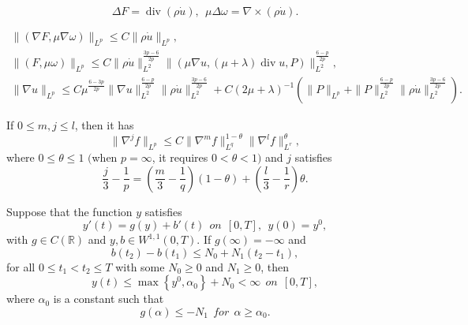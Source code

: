 \documentclass[10pt,a4paper]{amsart}
\DeclareMathOperator{\divv}{div}
\begin{document}
\begin{equation}\label{3.4}
\Delta F = \divv (\rho \dot u),\ \  \mu \Delta \omega = \nabla \times(\rho \dot u).
\end{equation}

\begin{gather}\label{3.5}
\|(\nabla F,\mu \nabla \omega )\|_{L^p} \leq C \|\rho \dot u\|_{L^p},
\\ \label{3.6}
\|(F, \mu \omega )\|_{L^p} \leq C \|\rho \dot u\|_{L^2}^{\frac{3p - 6}{2p}} \|(\mu \nabla u, (\mu + \lambda ) \divv u, P)\|_{L^2}^{\frac{6 - p}{2p}},
\\ \label{3.7}
\|\nabla u\|_{L^p}
\leq C \mu^{\frac{6 - 3p}{2p}} \|\nabla u\|_{L^2}^{\frac{6 - p}{2p}} \|\rho \dot{u}\|_{L^2}^{\frac{3 p -6}{2p}} + C \left( 2 \mu + \lambda \right)^{-1} \left( \|P\|_{L^p} + \|P\|_{L^2}^{\frac{6 - p}{2p}} \|\rho \dot{u}\|_{L^2}^{\frac{3 p -6}{2p}} \right).
\end{gather}

\begin{Lemma}\label{lem3.4}
 If $0\leq m,j\leq l$, then it has
$$
\|\nabla^{j}f\|_{L^p} \leq C\|\nabla^m f\|_{L^q}^{1-\theta} \|\nabla^l f\|_{L^r}^\theta,
$$
where $0\leq \theta\leq 1$ $($when $p=\infty$, it requires $0<\theta<1)$   and $j$ satisfies
$$
\frac{j}{3} - \frac{1}{p} = \left( \frac{m}{3} - \frac{1}{q} \right) (1-\theta) + \left(\frac{l}{3} - \frac{1}{r} \right) \theta.
$$
\end{Lemma}

\begin{Lemma}\label{lem3.5}
Suppose that the function $y$ satisfies
$$
y'(t) = g (y) + b'(t) \ \ on \ \ [0,T], \ \ y(0) = y^0,
$$
with $g \in C (\mathbb{R})$ and $y,b \in W^{1,1} (0,T)$. If $g(\infty ) = - \infty $ and
\begin{equation}\label{3.8}
b (t_2) - b(t_1) \leq N_0 + N_1 (t_2 - t_1),
\end{equation}
for all $0 \leq t_1 < t_2 \leq T$ with some $N_0 \geq 0$ and $N_1 \geq 0$, then $$
y(t) \leq \max \left\{y^0, \alpha_0 \right\} + N_0 < \infty\ \ on \ \ [0,T],
$$
where $\alpha_0$ is a constant such that
\begin{equation}\label{3.9}
g (\alpha) \leq - N_1 \ \ for \ \ \alpha \geq \alpha_0.
\end{equation}
\end{Lemma}
\end{document}
